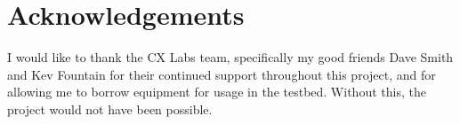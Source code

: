 \section*{Acknowledgements}
I would like to thank the CX Labs team, specifically my good friends Dave Smith and Kev Fountain for their continued support throughout this project, and for allowing me to borrow equipment for usage in the testbed. Without this, the project would not have been possible.